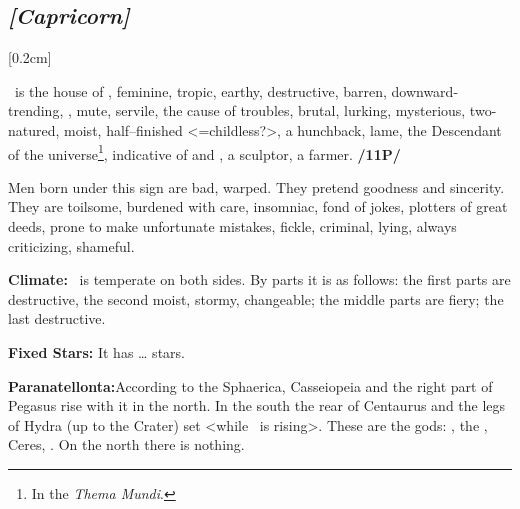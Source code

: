 \secbr
\subsection{\textit{[Capricorn]}}
[0.2cm]

 \Capricorn\, is the house of \Saturn,  feminine,  tropic,  earthy, destructive,  barren, downward-trending, ,  mute,  servile, the cause of troubles, brutal, lurking, mysterious, two-natured, moist, half–finished <=childless?>, a hunchback, lame, the Descendant of the universe\footnote{In the \textit{Thema Mundi}.}, indicative of  and , a sculptor, a farmer. \textbf{/11P/ }

Men born under this sign are bad, warped. They pretend goodness and sincerity. They are toilsome, burdened with care, insomniac, fond of jokes, plotters of great deeds, prone to make unfortunate mistakes, fickle, criminal, lying, always criticizing, shameful.

\textbf{Climate:} \Capricorn\, is temperate on both sides. By parts it is as follows: the first parts are destructive, the second moist, stormy, changeable; the middle parts are fiery; the last destructive. 

\textbf{Fixed Stars:} It has … stars.

\textbf{Paranatellonta:}According to the Sphaerica, Casseiopeia and the right part of Pegasus rise with it in the north. In the south the rear of Centaurus and the legs of Hydra (up to the Crater) set <while \Capricorn\, is rising>. These are the gods: \Venus, the \Moon, Ceres, \Mercury. On the north there is nothing.

